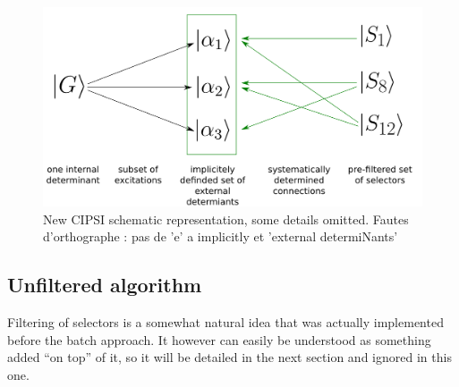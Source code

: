 \documentclass[./thesis.tex]{subfiles}
\begin{document}
\begin{figure}[h!]
	\begin{center}
		\includegraphics[width=0.8\columnwidth]{figures/cipsi/new_cipsi}
		\caption{New CIPSI schematic representation, some details omitted. 
\alert{ Fautes d'orthographe : pas de 'e' a implicitly et 'external determiNants'} }
		\label{fig:new_cipsi}
	\end{center}
\end{figure}

\subsection{Unfiltered algorithm}

Filtering of selectors is a somewhat natural idea that was actually implemented before the batch approach. It however can easily be understood as something added ``on top'' of it, so it will be detailed in the next section and ignored in this one.
\end{document}
